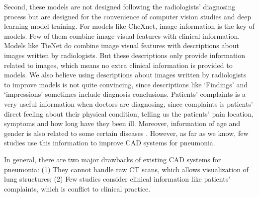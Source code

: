 \documentclass[journal]{IEEEtran}
\begin{document}
Second, these models are not designed following the radiologists' diagnosing process but are designed for the convenience of computer vision studies and deep learning model training. For models like CheXnet, image information is the key of models. Few of them combine image visual features with clinical information. Models like TieNet do combine image visual features with descriptions about images written by radiologists. But these descriptions only provide information related to images, which means no extra clinical information is provided to models. We also believe using descriptions about images written by radiologists to improve models is not quite convincing, since descriptions like `Findings' and `impressions' sometimes include diagnosis conclusions.
Patients' complaints is a very useful information when doctors are diagnosing, since complaints is patients' direct feeling about their physical condition, telling us the patients' pain location, symptoms and how long have they been ill. Moreover, information of age and gender is also related to some certain diseases\cite{xiaojian2011analysis} \cite{huang2014design}. However, as far as we know, few studies use this information to improve CAD systems for pneumonia. 

In general, there are two major drawbacks of existing CAD systems for pneumonia: (1) They cannot handle raw CT scans, which allows visualization of lung structures; (2) Few studies consider clinical information like patients' complaints, which is conflict to clinical practice.
\end{document}
